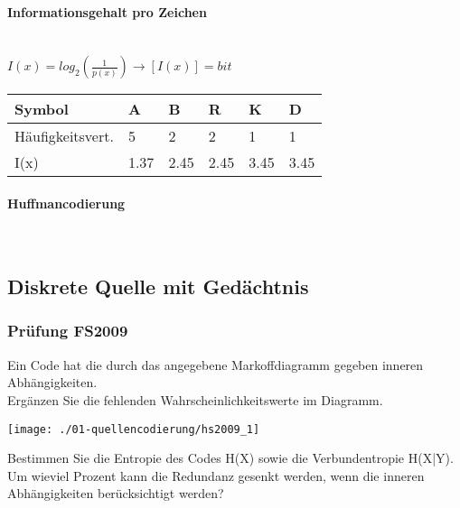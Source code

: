 \paragraph{Informationsgehalt pro Zeichen}\mbox{}\\
$I(x)=log_2(\frac{1}{p(x)}) \rightarrow [I(x)]=bit$

\begin{center}
    \centering
    \begin{tabular}{p{1.9cm} | p{0.5cm} | p{0.5cm} | p{0.5cm} | p{0.5cm} | p{0.5cm} }
        \bfseries{Symbol} & \bfseries{A} & \bfseries{B} & \bfseries{R} & \bfseries{K} & \bfseries{D}\\ \hline
        Häufigkeitsvert. & 5 & 2 & 2 & 1 & 1\\ 
        I(x) & 1.37 & 2.45 & 2.45 & 3.45 & 3.45
    \end{tabular}
\end{center}

\paragraph{Huffmancodierung}\mbox{}\\

\subsection{Diskrete Quelle mit Gedächtnis}
\subsubsection{Prüfung FS2009}
Ein Code hat die durch das angegebene Markoffdiagramm gegeben inneren Abhängigkeiten.\\

Ergänzen Sie die fehlenden Wahrscheinlichkeitswerte im Diagramm.
\begin{center}
    \vspace{-8pt}
    \texttt{[image: ./01-quellencodierung/hs2009\_1]}
    \vspace{-8pt}
\end{center}

Bestimmen Sie die Entropie des Codes H(X) sowie die Verbundentropie H(X|Y). Um wieviel Prozent kann die Redundanz gesenkt werden, wenn die inneren Abhängigkeiten berücksichtigt werden?\\

